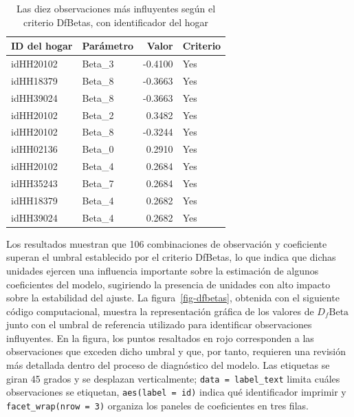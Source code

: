 \documentclass[
  spanish,
  11pt,
  letterpaper,
  oneside,
  open=any]{scrbook}
\begin{document}
{

\begin{longtable}[]{@{}llrl@{}}

\caption{\label{tbl-dfbetas-influyentes}Las diez observaciones más
influyentes según el criterio DfBetas, con identificador del hogar}

\tabularnewline

\toprule\noalign{}
ID del hogar & Parámetro & Valor & Criterio \\
\midrule\noalign{}
\endhead
\bottomrule\noalign{}
\endlastfoot
idHH20102 & Beta\_3 & -0.4100 & Yes \\
idHH18379 & Beta\_8 & -0.3663 & Yes \\
idHH39024 & Beta\_8 & -0.3663 & Yes \\
idHH20102 & Beta\_2 & 0.3482 & Yes \\
idHH20102 & Beta\_8 & -0.3244 & Yes \\
idHH02136 & Beta\_0 & 0.2910 & Yes \\
idHH20102 & Beta\_4 & 0.2684 & Yes \\
idHH35243 & Beta\_7 & 0.2684 & Yes \\
idHH18379 & Beta\_4 & 0.2682 & Yes \\
idHH39024 & Beta\_4 & 0.2682 & Yes \\

\end{longtable}

}

Los resultados muestran que 106 combinaciones de observación y
coeficiente superan el umbral establecido por el criterio DfBetas, lo
que indica que dichas unidades ejercen una influencia importante sobre
la estimación de algunos coeficientes del modelo, sugiriendo la
presencia de unidades con alto impacto sobre la estabilidad del ajuste.
La figura~\ref{fig-dfbetas}, obtenida con el siguiente código
computacional, muestra la representación gráfica de los valores de
\(D_f\text{Beta}\) junto con el umbral de referencia utilizado para
identificar observaciones influyentes. En la figura, los puntos
resaltados en rojo corresponden a las observaciones que exceden dicho
umbral y que, por tanto, requieren una revisión más detallada dentro del
proceso de diagnóstico del modelo. Las etiquetas se giran 45 grados y se
desplazan verticalmente; \texttt{data\ =\ label\_text} limita cuáles
observaciones se etiquetan, \texttt{aes(label\ =\ id)} indica qué
identificador imprimir y \texttt{facet\_wrap(nrow\ =\ 3)} organiza los
paneles de coeficientes en tres filas.
\end{document}
